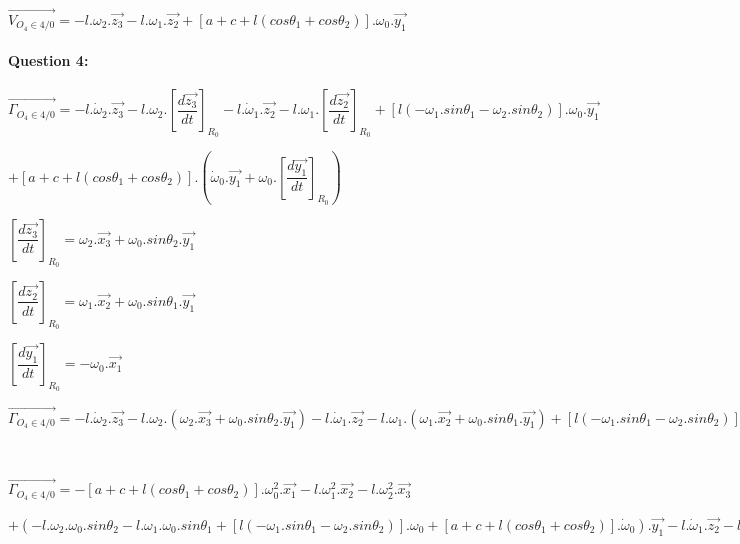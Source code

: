 ~\

$\overrightarrow{V_{O_{4}\in 4/0}}=-l.\omega_2.\overrightarrow{z_3}-l.\omega_1.\overrightarrow{z_2}+\left[a+c+l(cos\theta_1+cos\theta_2)\right].\omega_{0}.\overrightarrow{y_1}$

\paragraph{Question 4:}

$\overrightarrow{\Gamma_{O_{4}\in 4/0}}=-l.\dot{\omega}_2.\overrightarrow{z_3}-l.\omega_2.\left[\dfrac{d\overrightarrow{z_3}}{dt}\right]_{R_0}-l.\dot{\omega}_1.\overrightarrow{z_2}-l.\omega_1.\left[\dfrac{d\overrightarrow{z_2}}{dt}\right]_{R_0}+\left[l(-\omega_1.sin\theta_1-\omega_2.sin\theta_2)\right].\omega_{0}.\overrightarrow{y_1}$

$+\left[a+c+l(cos\theta_1+cos\theta_2)\right].\left(\dot{\omega}_{0}.\overrightarrow{y_1}+\omega_{0}.\left[\dfrac{d\overrightarrow{y_1}}{dt}\right]_{R_0}\right)$ 

$\left[\dfrac{d\overrightarrow{z_3}}{dt}\right]_{R_0}=\omega_2.\overrightarrow{x_3}+\omega_0.sin\theta_2.\overrightarrow{y_1}$

$\left[\dfrac{d\overrightarrow{z_2}}{dt}\right]_{R_0}=\omega_1.\overrightarrow{x_2}+\omega_0.sin\theta_1.\overrightarrow{y_1}$

$\left[\dfrac{d\overrightarrow{y_1}}{dt}\right]_{R_0}=-\omega_0.\overrightarrow{x_1}$

$\overrightarrow{\Gamma_{O_{4}\in 4/0}}=-l.\dot{\omega}_2.\overrightarrow{z_3}-l.\omega_2.\left(\omega_2.\overrightarrow{x_3}+\omega_0.sin\theta_2.\overrightarrow{y_1}\right)-l.\dot{\omega}_1.\overrightarrow{z_2}-l.\omega_1.\left(\omega_1.\overrightarrow{x_2}+\omega_0.sin\theta_1.\overrightarrow{y_1}\right)+\left[l(-\omega_1.sin\theta_1-\omega_2.sin\theta_2)\right].\omega_{0}.\overrightarrow{y_1}+\left[a+c+l(cos\theta_1+cos\theta_2)\right].\left(\dot{\omega}_{0}.\overrightarrow{y_1}-\omega_0^2.\overrightarrow{x_1}\right)$

~\

$\overrightarrow{\Gamma_{O_{4}\in 4/0}}=-\left[a+c+l(cos\theta_1+cos\theta_2)\right].\omega_0^2.\overrightarrow{x_1}-l.\omega_1^2.\overrightarrow{x_2}-l.\omega_2^2.\overrightarrow{x_3}$

$+\left(-l.\omega_2.\omega_0.sin\theta_2-l.\omega_1.\omega_0.sin\theta_1+\left[l(-\omega_1.sin\theta_1-\omega_2.sin\theta_2)\right].\omega_{0}+\left[a+c+l(cos\theta_1+cos\theta_2)\right].\dot{\omega}_{0}\right).\overrightarrow{y_1}-l.\dot{\omega}_1.\overrightarrow{z_2}-l.\dot{\omega}_2.\overrightarrow{z_3}$

